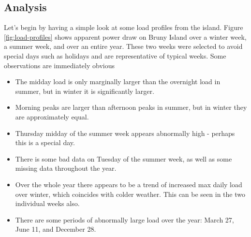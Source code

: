 \subsection{Analysis}
Let's begin by having a simple look at some load profiles from the island.
Figure \ref{fig:load-profiles} shows apparent power draw on Bruny Island over a winter week, a summer week, and over an entire year.
These two weeks were selected to avoid special days such as holidays and are representative of typical weeks.
Some observations are immediately obvious
\begin{itemize}
	\item The midday load is only marginally larger than the overnight load in summer, but in winter it is significantly larger.
	\item Morning peaks are larger than afternoon peaks in summer, but in winter they are approximately equal.
	\item Thursday midday of the summer week appears abnormally high - perhaps this is a special day.
	\item There is some bad data on Tuesday of the summer week, as well as some missing data throughout the year.
	\item Over the whole year there appears to be a trend of increased max daily load over winter, which coincides with colder weather. This can be seen in the two individual weeks also.
	\item There are some periods of abnormally large load over the year: March 27, June 11, and December 28.
\end{itemize}

